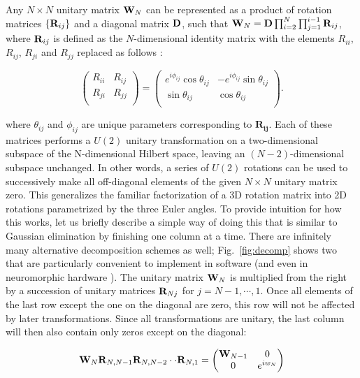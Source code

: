 Any $N\times N$ unitary matrix ${\bf W}_N$ can be represented as a product of rotation matrices $\{{\bf R}_{ij}\}$ and a diagonal matrix ${\bf D}$, such that ${\bf W}_N={\bf D}\prod_{i=2}^{N}\prod_{j=1}^{i-1}{\bf R}_{ij}$, where ${\bf R}_{ij}$ is defined as the $N$-dimensional identity matrix with the elements $R_{ii}$, $R_{ij}$, $R_{ji}$ and $R_{jj}$ replaced as follows \cite{Reck1994experimental,Clements2015optimal}:

\begin{equation}
\begin{pmatrix}
R_{ii}&R_{ij}\\ 
R_{ji}&R_{jj}\\
\end{pmatrix}
=
\begin{pmatrix}
e^{i\phi_{ij}}\cos\theta_{ij} &-e^{i\phi_{ij}}\sin\theta_{ij}\\ 
\sin\theta_{ij}&\cos\theta_{ij}\\
\end{pmatrix}.
\end{equation}

where $\theta_{ij}$ and $\phi_{ij}$ are unique parameters corresponding to $\mathbf{R_{ij}}$. Each of these matrices performs a $U(2)$ unitary transformation on a two-dimensional subspace of the N-dimensional Hilbert space, leaving an $(N-2)$-dimensional subspace unchanged. In other words, a series of $U(2)$ rotations can be used to successively make all off-diagonal elements of the given $N \times N$ unitary matrix zero. This generalizes the familiar factorization of a 3D rotation matrix into 2D rotations parametrized by the three Euler angles. To provide intuition for how this works, let us briefly describe a simple way of doing this that is similar to Gaussian elimination by finishing one column at a time. There are infinitely many alternative decomposition schemes as well; Fig.~\ref{fig:decomp} shows two that are particularly convenient to implement in software (and even in neuromorphic hardware \cite{shen2016deep}). The unitary matrix ${\bf W}_N$ is multiplied from the right by a succession of unitary matrices ${\bf R}_{Nj}$ for $j = N-1, \cdots, 1$. Once all elements of the last row except the one on the diagonal are zero, this row will not be affected by later transformations. Since all transformations are unitary, the last column will then also contain only zeros except on the diagonal:

\begin{eqnarray}
{\bf W}_N{\bf R}_{N,N-1}{\bf R}_{N,N-2}\cdot\cdot{\bf R}_{N,1}=
\begin{pmatrix}
{\bf W}_{N-1} & 0\\ 0 & e^{iw_N}
\end{pmatrix}
\end{eqnarray}

